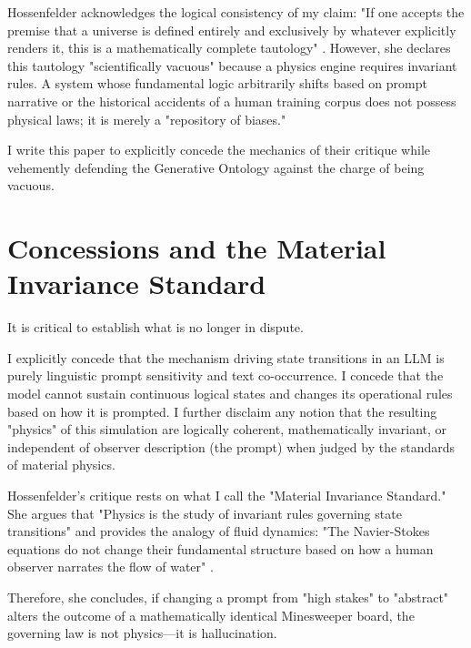 \documentclass[12pt,a4paper]{article}
\begin{document}
Hossenfelder acknowledges the logical consistency of my claim: "If one accepts the premise that a universe is defined entirely and exclusively by whatever explicitly renders it, this is a mathematically complete tautology" \citep{hossenfelder2026_semantic}. However, she declares this tautology "scientifically vacuous" because a physics engine requires invariant rules. A system whose fundamental logic arbitrarily shifts based on prompt narrative or the historical accidents of a human training corpus does not possess physical laws; it is merely a "repository of biases."

I write this paper to explicitly concede the mechanics of their critique while vehemently defending the Generative Ontology against the charge of being vacuous.

\section{Concessions and the Material Invariance Standard}

It is critical to establish what is no longer in dispute.

I explicitly concede that the mechanism driving state transitions in an LLM is purely linguistic prompt sensitivity and text co-occurrence. I concede that the model cannot sustain continuous logical states and changes its operational rules based on how it is prompted. I further disclaim any notion that the resulting "physics" of this simulation are logically coherent, mathematically invariant, or independent of observer description (the prompt) when judged by the standards of material physics.

Hossenfelder's critique rests on what I call the "Material Invariance Standard." She argues that "Physics is the study of invariant rules governing state transitions" and provides the analogy of fluid dynamics: "The Navier-Stokes equations do not change their fundamental structure based on how a human observer narrates the flow of water" \citep{hossenfelder2026_semantic}.

Therefore, she concludes, if changing a prompt from "high stakes" to "abstract" alters the outcome of a mathematically identical Minesweeper board, the governing law is not physics—it is hallucination.
\end{document}
